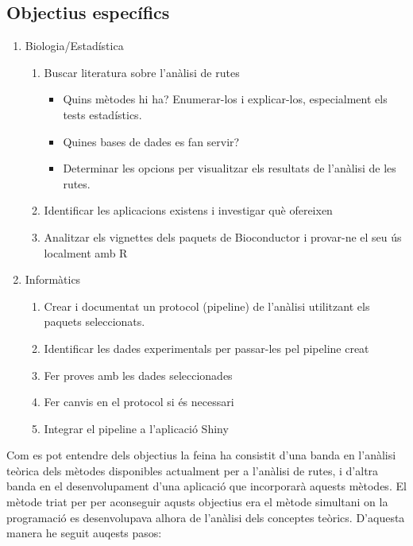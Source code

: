 \subsection{Objectius específics}
\begin{enumerate}
\item Biologia/Estadística
\begin{enumerate}
\item Buscar literatura sobre l'anàlisi de rutes
\begin{itemize}
\item Quins mètodes hi ha? Enumerar-los i explicar-los, especialment els tests estadístics.
\item Quines bases de dades es fan servir?
\item Determinar les opcions per visualitzar els resultats de l'anàlisi de les rutes.
\end{itemize}
\item Identificar les aplicacions existens i investigar què ofereixen
\item Analitzar els vignettes dels paquets de Bioconductor i provar-ne el seu ús localment amb R
\end{enumerate}
\item Informàtics
\begin{enumerate}
\item Crear i documentat un protocol (pipeline) de l'anàlisi utilitzant els paquets seleccionats. 
\item Identificar les dades experimentals per passar-les pel pipeline creat
\item Fer proves amb les dades seleccionades
\item Fer canvis en el protocol si és necessari
\item Integrar el pipeline a l'aplicació Shiny
\end{enumerate}
\end{enumerate}

Com es pot entendre dels objectius la feina ha consistit d'una banda en l'anàlisi teòrica dels mètodes disponibles actualment per a l'anàlisi de rutes, i d'altra banda en el desenvolupament d'una aplicació que incorporarà aquests mètodes. El mètode triat per per aconseguir aqusts objectius era el mètode simultani on la programació es desenvolupava alhora de l'anàlisi dels conceptes teòrics. D'aquesta manera he seguit auqests pasos:

